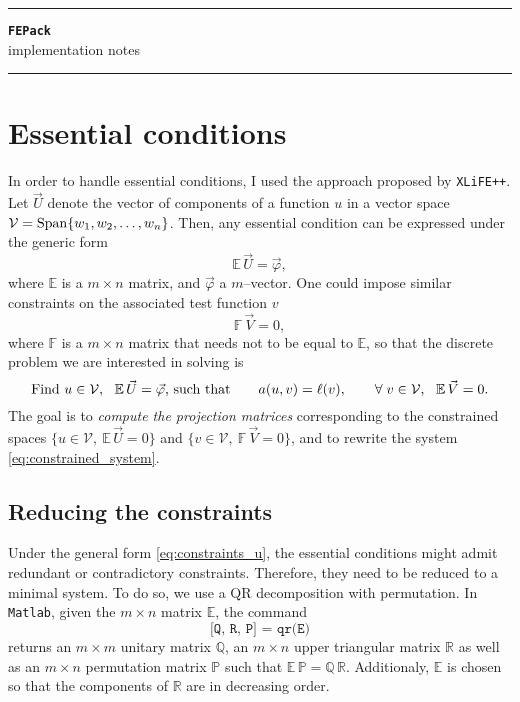 \documentclass[11pt]{article}
\begin{document}
\begin{center}%
%
\rule{\textwidth}{0.0281cm}
\Large \textbf{\texttt{FEPack}}
\\
implementation notes
%
\vspace{-0.5\baselineskip}
\rule{\textwidth}{0.0281cm}
\end{center}

\noindent

\section{Essential conditions}
In order to handle essential conditions, I used the approach proposed by \texttt{XLiFE++}. Let $\vec{U}$ denote the vector of components of a function $u$ in a vector space $\mathcal{V} = \operatorname{Span}\{w_1, w_2,\dots,w_n\}$. Then, any essential condition can be expressed under the generic form
\begin{equation}
  \displaystyle
  \mathbb{E}\, \vec{U} = \vec{\varphi},
  \label{eq:constraints_u}
\end{equation}
where $\mathbb{E}$ is a $m \times n$ matrix, and $\vec{\varphi}$ a $m$--vector. One could impose similar constraints on the associated test function $v$
\begin{equation}
  \displaystyle
  \mathbb{F}\, \vec{V} = 0,
\end{equation}
where $\mathbb{F}$ is a $m \times n$ matrix that needs not to be equal to $\mathbb{E}$, so that the discrete problem we are interested in solving is
\begin{equation}
  \displaystyle
  \textnormal{Find $u \in \mathcal{V},\ \ \mathbb{E}\, \vec{U} = \vec{\varphi}$, such that} \qquad a(u, v) = \ell(v), \qquad \forall\; v \in \mathcal{V},\ \ \mathbb{E}\, \vec{V} = 0.
  \label{eq:constrained_system}
\end{equation}
The goal is to \emph{compute the projection matrices} corresponding to the constrained spaces $\{u \in \mathcal{V},\ \mathbb{E}\, \vec{U} = 0\}$ and $\{v \in \mathcal{V},\ \mathbb{F}\, \vec{V} = 0\}$, and to rewrite the system \eqref{eq:constrained_system}.

\subsection{Reducing the constraints}
Under the general form \eqref{eq:constraints_u}, the essential conditions might admit redundant or contradictory constraints. Therefore, they need to be reduced to a minimal system. To do so, we use a QR decomposition with permutation. In \texttt{Matlab}, given the $m \times n$ matrix $\mathbb{E}$, the command
\[
  \texttt{[Q, R, P] = qr(E)}
\]
returns an $m \times m$ unitary matrix $\mathbb{Q}$, an $m \times n$ upper triangular matrix $\mathbb{R}$ as well as an $m \times n$ permutation matrix $\mathbb{P}$ such that $\mathbb{E}\, \mathbb{P} = \mathbb{Q}\, \mathbb{R}$. Additionaly, $\mathbb{E}$ is chosen so that the components of $\mathbb{R}$ are in decreasing order.   
\end{document}
